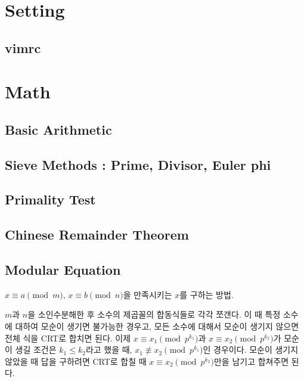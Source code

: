 \documentclass[10pt,landscape,a4paper,twocolumn]{article}
\begin{document}
\tableofcontents


\section{Setting}

\subsection{vimrc}



\section{Math}

\subsection{Basic Arithmetic}


\subsection{Sieve Methods : Prime, Divisor, Euler phi}


\subsection{Primality Test}


\subsection{Chinese Remainder Theorem}


\subsection{Modular Equation}

$x \equiv a \pmod{m}$, $x \equiv b \pmod{n}$을 만족시키는 $x$를 구하는 방법.

$m$과 $n$을 소인수분해한 후 소수의 제곱꼴의 합동식들로 각각 쪼갠다.
이 때 특정 소수에 대하여 모순이 생기면 불가능한 경우고,
모든 소수에 대해서 모순이 생기지 않으면 전체 식을 CRT로 합치면 된다. 이제
$x \equiv x_1 \pmod{p^{k_1}}$과 $x \equiv x_2 \pmod{p^{k_2}}$가
모순이 생길 조건은 $k_1 \leq k_2$라고 했을 때,
$x_1 \not\equiv x_2 \pmod{p^{k_1}}$인 경우이다.
모순이 생기지 않았을 때 답을 구하려면 
CRT로 합칠 때 $x \equiv x_2 \pmod{p^{k_2}}$만을 남기고 합쳐주면 된다.
\end{document}
